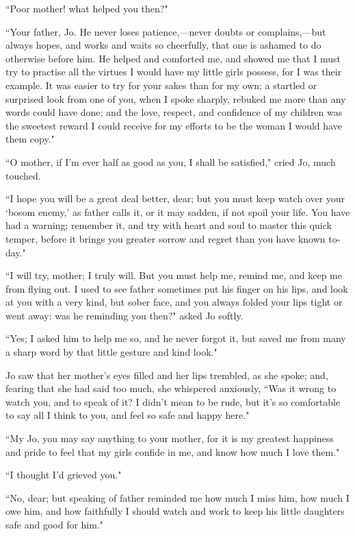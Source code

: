 ``Poor mother! what helped you then?"

``Your father, Jo. He never loses patience,---never doubts or
complains,---but always hopes, and works and waits so cheerfully, that
one is ashamed to do otherwise before him. He helped and comforted me,
and showed me that I must try to practise all the virtues I would have
my little girls possess, for I was their example. It was easier to try
for your sakes than for my own; a startled or surprised look from one of
you, when I spoke sharply, rebuked me more than any words could have
done; and the love, respect, and confidence of my children was the
sweetest reward I could receive for my efforts to be the woman I would
have them copy."

``O mother, if I'm ever half as good as you, I shall be
satisfied," cried Jo, much touched.

``I hope you will be a great deal better, dear; but you must keep watch
over your `bosom enemy,' as father
calls it, or it may sadden, if not spoil your life. You have had a
warning; remember it, and try with heart and soul to master this quick
temper, before it brings you greater sorrow and regret than you have
known to-day."

``I will try, mother; I truly will. But you must help me, remind me, and
keep me from flying out. I used to see father sometimes put his finger
on his lips, and look at you with a very kind, but sober face, and you
always folded your lips tight or went away: was he reminding you then?"
asked Jo softly.

``Yes; I asked him to help me so, and he never forgot it, but saved me
from many a sharp word by that little gesture and kind look."

Jo saw that her mother's eyes filled and her lips
trembled, as she spoke; and, fearing that she had said too much, she
whispered anxiously, ``Was it wrong to watch you, and to speak of it? I
didn't mean to be rude, but it's so
comfortable to say all I think to you, and feel so safe and happy here."

``My Jo, you may say anything to your mother, for it is my greatest
happiness and pride to feel that my girls confide in me, and know how
much I love them."

``I thought I'd grieved you."

``No, dear; but speaking of father reminded me how much I miss him, how
much I owe him, and how faithfully I should watch and work to keep his
little daughters safe and good for him."

